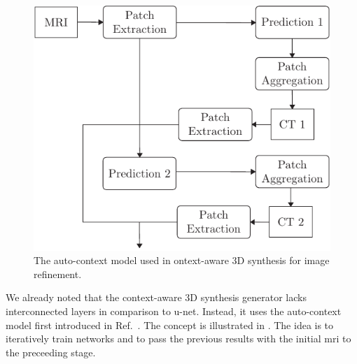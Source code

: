 \begin{figure}[h]
  \centering
  \includegraphics[width=\linewidth]{figure/synthesis-refine.pdf}
  \caption{The auto-context model used in ontext-aware 3D synthesis for
    image refinement.
	}\label{fig:synthesis:refine}
\end{figure}
We already noted that the context-aware 3D synthesis generator lacks
interconnected layers in comparison to u-net. Instead, it uses the
auto-context model first introduced in Ref.~\cite{Tu2010}. The concept is
illustrated in . The idea is to iteratively train
networks and to pass the previous results with the initial \gls{mri} to the
preceeding stage.
